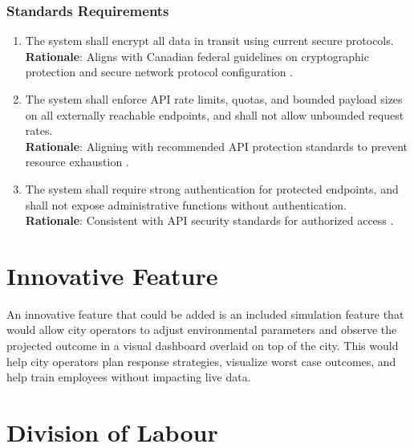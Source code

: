\documentclass[]{article}
\begin{document}
\subsubsection{Standards Requirements}
\label{ssub:standards_requirements}
\begin{enumerate}[{LR-STD}1. ]
    \item The system shall encrypt all data in transit using current secure protocols. \\
    \textbf{Rationale}: Aligns with Canadian federal guidelines on cryptographic protection and secure network protocol configuration \cite{canEncrypt,secureProtocols}.

    \item The system shall enforce API rate limits, quotas, and bounded payload sizes on all externally reachable endpoints, and shall not allow unbounded request rates. \\
    \textbf{Rationale}: Aligning with recommended API protection standards to prevent resource exhaustion \cite{nistAPI}.

    \item The system shall require strong authentication for protected endpoints, and shall not expose administrative functions without authentication. \\
    \textbf{Rationale}: Consistent with API security standards for authorized access \cite{nistAPI}.
\end{enumerate}


\newpage
\section{Innovative Feature}
\label{sec:innovative_feature}
An innovative feature that could be added is an included simulation feature that would allow city operators to adjust environmental parameters and observe the projected outcome in a visual dashboard overlaid on top of the city. This would help city operators plan response strategies, visualize worst case outcomes, and help train employees without impacting live data.

\newpage
\appendix
\section{Division of Labour}
\label{sec:division_of_labour}
\end{document}
